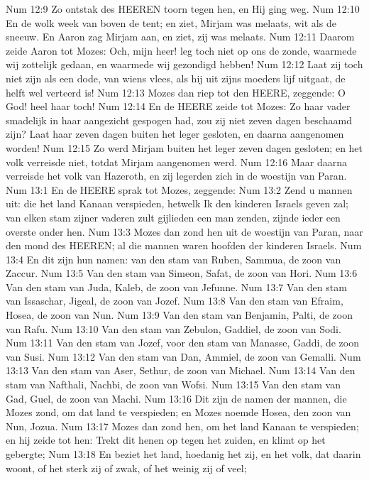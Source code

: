 Num 12:9  Zo ontstak des HEEREN toorn tegen hen, en Hij ging weg.
Num 12:10  En de wolk week van boven de tent; en ziet, Mirjam was melaats, wit als de sneeuw. En Aaron zag Mirjam aan, en ziet, zij was melaats.
Num 12:11  Daarom zeide Aaron tot Mozes: Och, mijn heer! leg toch niet op ons de zonde, waarmede wij zottelijk gedaan, en waarmede wij gezondigd hebben!
Num 12:12  Laat zij toch niet zijn als een dode, van wiens vlees, als hij uit zijns moeders lijf uitgaat, de helft wel verteerd is!
Num 12:13  Mozes dan riep tot den HEERE, zeggende: O God! heel haar toch!
Num 12:14  En de HEERE zeide tot Mozes: Zo haar vader smadelijk in haar aangezicht gespogen had, zou zij niet zeven dagen beschaamd zijn? Laat haar zeven dagen buiten het leger gesloten, en daarna aangenomen worden!
Num 12:15  Zo werd Mirjam buiten het leger zeven dagen gesloten; en het volk verreisde niet, totdat Mirjam aangenomen werd.
Num 12:16  Maar daarna verreisde het volk van Hazeroth, en zij legerden zich in de woestijn van Paran.
Num 13:1  En de HEERE sprak tot Mozes, zeggende:
Num 13:2  Zend u mannen uit: die het land Kanaan verspieden, hetwelk Ik den kinderen Israels geven zal; van elken stam zijner vaderen zult gijlieden een man zenden, zijnde ieder een overste onder hen.
Num 13:3  Mozes dan zond hen uit de woestijn van Paran, naar den mond des HEEREN; al die mannen waren hoofden der kinderen Israels.
Num 13:4  En dit zijn hun namen: van den stam van Ruben, Sammua, de zoon van Zaccur.
Num 13:5  Van den stam van Simeon, Safat, de zoon van Hori.
Num 13:6  Van den stam van Juda, Kaleb, de zoon van Jefunne.
Num 13:7  Van den stam van Issaschar, Jigeal, de zoon van Jozef.
Num 13:8  Van den stam van Efraim, Hosea, de zoon van Nun.
Num 13:9  Van den stam van Benjamin, Palti, de zoon van Rafu.
Num 13:10  Van den stam van Zebulon, Gaddiel, de zoon van Sodi.
Num 13:11  Van den stam van Jozef, voor den stam van Manasse, Gaddi, de zoon van Susi.
Num 13:12  Van den stam van Dan, Ammiel, de zoon van Gemalli.
Num 13:13  Van den stam van Aser, Sethur, de zoon van Michael.
Num 13:14  Van den stam van Nafthali, Nachbi, de zoon van Wofsi.
Num 13:15  Van den stam van Gad, Guel, de zoon van Machi.
Num 13:16  Dit zijn de namen der mannen, die Mozes zond, om dat land te verspieden; en Mozes noemde Hosea, den zoon van Nun, Jozua.
Num 13:17  Mozes dan zond hen, om het land Kanaan te verspieden; en hij zeide tot hen: Trekt dit henen op tegen het zuiden, en klimt op het gebergte;
Num 13:18  En beziet het land, hoedanig het zij, en het volk, dat daarin woont, of het sterk zij of zwak, of het weinig zij of veel;
